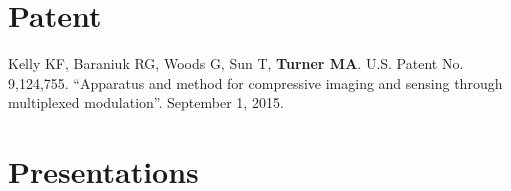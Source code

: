 \documentclass[letterpaper,11pt,oneside]{article}
\begin{document}
\noindent
\section*{\textcolor{gunmetal}{Patent}}

  \begin{hangparas}{0.25in}{1}
  Kelly KF, Baraniuk RG, Woods G, Sun T, \textbf{Turner MA}. U.S. Patent No. 9,124,755. 
  ``Apparatus and method for compressive imaging and sensing through multiplexed modulation''.
  September 1, 2015.

    
  \end{hangparas}



\noindent

\section*{\textcolor{gunmetal}{Presentations}}
\end{document}

